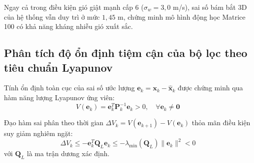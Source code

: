 \begin{table}[H]
\centering
\caption{Đo đạc sai số bám bắt 3D của drone dưới các cấp độ nhiễu loạn gió giật tầng thấp}
\label{tab:dryden-wind-turbulence-table}
\end{table}

Ngay cả trong điều kiện gió giật mạnh cấp 6 ($\sigma_w = 3{,}0$ m/s), sai số bám bắt 3D của hệ thống vẫn duy trì ở mức $1{,}45$ m, chứng minh mô hình động học Matrice 100 có khả năng kháng nhiễu gió xuất sắc.

\subsection{Phân tích độ ổn định tiệm cận của bộ lọc theo tiêu chuẩn Lyapunov}

\hspace{0.5cm} Tính ổn định toàn cục của sai số ước lượng $\mathbf{e}_k = \mathbf{x}_k - \hat{\mathbf{x}}_k$ được chứng minh qua hàm năng lượng Lyapunov ứng viên:
\begin{equation}
V(\mathbf{e}_k) = \mathbf{e}_k^T \mathbf{P}_k^{-1} \mathbf{e}_k > 0, \quad \forall \mathbf{e}_k \ne \mathbf{0}
\label{eq:lyapunov-candidate-function-filter}
\end{equation}

Đạo hàm sai phân theo thời gian $\Delta V_k = V(\mathbf{e}_{k+1}) - V(\mathbf{e}_k)$ thỏa mãn điều kiện suy giảm nghiêm ngặt:
\begin{equation}
\Delta V_k \le - \mathbf{e}_k^T \mathbf{Q}_L \mathbf{e}_k \le - \lambda_{\min}(\mathbf{Q}_L) \|\mathbf{e}_k\|^2 < 0
\label{eq:lyapunov-negative-definite-decay}
\end{equation}
với $\mathbf{Q}_L$ là ma trận dương xác định.

